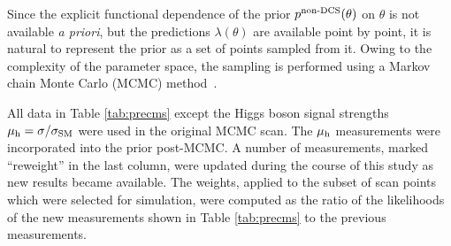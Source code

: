 Since the explicit functional dependence of the prior $p^\textrm{non-DCS}(\theta)$ on
$\theta$ is not available \emph{a priori}, but the predictions $\lambda(\theta)$ are available point by point, it is natural to represent the prior as a set of points sampled from it.  Owing to the complexity of the parameter space, the sampling is performed
using a Markov chain Monte Carlo (MCMC) 
method~\cite{MCMC1,MCMC2,MCMC3,MCMC4,Bayes:2}. 




All data in Table \ref{tab:precms} except the Higgs boson signal strengths $\mu_{\rm h}=\sigma/\sigma_{\text{SM}}$ were used in the
original MCMC scan. The $\mu_{\rm h}$ measurements were incorporated into the prior post-MCMC.    
A number of measurements, marked ``reweight'' in the last column, were updated during the course of this study as new results
became available.  The weights, applied to the subset of scan points which were selected for simulation, were computed as the ratio of the likelihoods of the new measurements shown in
Table \ref{tab:precms} to the previous measurements.    


